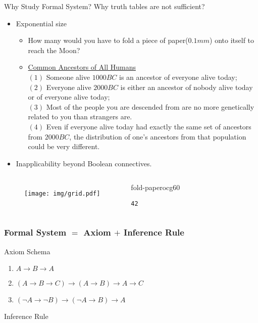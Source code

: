 \documentclass[UTF8,11pt,colorlinks,compress,openany]{beamer}%
\begin{document}
\begin{frame}[fragile]{Why Study Formal System?}
	Why truth tables are not sufficient?
	\begin{itemize}
		\item Exponential size
		\begin{itemize}
			\item How many  would you have to fold a piece of paper($0.1mm$) onto itself to reach the Moon?
			\item \href{http://nautil.us/blog/we-are-all-princes-paupers-and-part-of-the-human-family}{Common Ancestors of All Humans}\\
			$(1)$ Someone alive $1000BC$ is an ancestor of everyone alive today;\\
			$(2)$ Everyone alive $2000BC$ is either an ancestor of nobody alive today or of everyone alive today;\\
			$(3)$ Most of the people you are descended from are no more genetically related to you than strangers are.\\
			$(4)$ Even if everyone alive today had exactly the same set of ancestors from $2000BC$, the distribution of one's ancestors from that population could be very different.
		\end{itemize}
		\item Inapplicability beyond Boolean connectives.
	\end{itemize}
\begin{columns}
	\begin{figure}[H]
	\texttt{[image: img/grid.pdf]}
	\end{figure}
\begin{ocg}{fold-paper}{ocg6}{0}
\begin{verbatim}
42
\end{verbatim}
\end{ocg}
\end{columns}
\end{frame}

\begin{frame}\frametitle{Formal System $=$ Axiom $+$ Inference Rule}
		\begin{block}{Axiom Schema}
			\begin{enumerate}
				\item $A\to B\to A$
				\item $(A\to B\to C)\to(A\to B)\to A\to C$
				\item $(\neg A\to\neg B)\to(\neg A\to B)\to A$
			\end{enumerate}
		\end{block}
		\begin{block}{Inference Rule}
			\begin{prooftree}
				\alwaysSingleLine
				\RightLabel{\textcolor{yellow}{[MP]}}
			\end{prooftree}
		\end{block}
\end{frame}
\end{document}

